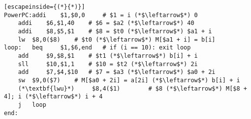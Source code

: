 \documentclass[10pt,letterpaper]{article}
\begin{document}
\begin{enumerate}[label=\textbf{Problem \arabic*.}]
\begin{lstlisting}[escapeinside={(*}{*)}]
PowerPC:addi 	$1,$0,0 	# $1 = i (*$\leftarrow$*) 0
 	addi 	$6,$1,40 	# $6 = $a2 (*$\leftarrow$*) 40
	addi 	$8,$5,$1 	# $8 = $t0 (*$\leftarrow$*) $a1 + i
	lw 	$8,0($8) 	# $t0 (*$\leftarrow$*) M[$a1 + i] = b[i]
loop:	beq 	$1,$6,end 	# if (i == 10): exit loop
	add 	$9,$8,$1 	# $t1 (*$\leftarrow$*) b[i] + i
	sll 	$10,$1,1 	# $10 = $t2 (*$\leftarrow$*) 2i
	add 	$7,$4,$10 	# $7 = $a3 (*$\leftarrow$*) $a0 + 2i 
	sw 	$9,0($7) 	# M[$a0 + 2i] = a[2i] (*$\leftarrow$*) b[i] + i
	(*\textbf{lwu}*)     $8,4($1) 	     # $8 (*$\leftarrow$*) M[$8 + 4]; i (*$\leftarrow$*) i + 4
	j 	loop
end: 
\end{lstlisting}
\end{enumerate}
\end{document}
